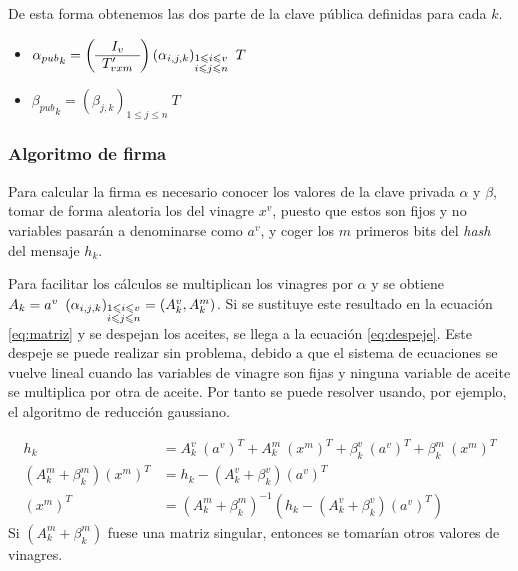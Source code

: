De esta forma obtenemos las dos parte de la clave pública definidas para cada $k$.

\begin{itemize}
	\item ${\alpha_{pub}}_k = \left(
	\begin{array}{c}
	I_v \\
	\hline
	T'_{v x m}
	\end{array}
	\right) \left(\alpha_{i,j,k}\right)_{\begin{subarray}{l}{1 \leqslant i\leqslant v }\\ {i\leqslant j \leqslant n}\end{subarray}} \ T$
	
	\item ${\beta_{pub}}_k = \left(\beta_{j,k}\right)_{1\leqslant j\leqslant n}\ T$
\end{itemize}


\subsubsection{Algoritmo de firma}

Para calcular la firma es necesario conocer los valores de la clave privada $\alpha$ y $\beta$, tomar de forma aleatoria los del vinagre $x^v$, puesto que estos son fijos y no variables pasarán a denominarse como $a^v$, y coger los $m$ primeros bits del \textit{hash} del mensaje $h_k$.

Para facilitar los cálculos se multiplican los vinagres por $\alpha$ y se obtiene \mbox{$A_k = a^v\ \left(\alpha_{i,j,k}\right)_{\begin{subarray}{l}{1 \leqslant i\leqslant v }\\ {i\leqslant j \leqslant n}\end{subarray}} = \left(A^v_k, A^m_k\right)$}. Si se sustituye este resultado en la ecuación \ref{eq:matriz} y se despejan los aceites, se llega a la ecuación \ref{eq:despeje}. Este despeje se puede realizar sin problema, debido a que el sistema de ecuaciones se vuelve lineal cuando las variables de vinagre son fijas y ninguna variable de aceite se multiplica por otra de aceite. Por tanto se puede resolver usando, por ejemplo, el algoritmo de reducción gaussiano.

\begin{align}
h_k &= A_k^v\ (a^v)^{\scriptscriptstyle T} +  A_k^m\ (x^m)^{\scriptscriptstyle T} + \beta_k^v\ (a^v)^{\scriptscriptstyle T} + \beta_k^m\ (x^m)^{\scriptscriptstyle T}\\
\label{eq:ter-coef}
(A_k^m + \beta_k^m) (x^m)^{\scriptscriptstyle T} &= h_k - (A_k^v + \beta_k^v) (a^v)^{\scriptscriptstyle T}\\
\label{eq:despeje}
(x^m)^{\scriptscriptstyle T} &= (A_k^m + \beta_k^m)^{-1} (h_k - (A_k^v + \beta_k^v) (a^v)^{\scriptscriptstyle T})
\end{align}
Si $(A_k^m + \beta_k^m)$ fuese una matriz singular, entonces se tomarían otros valores de vinagres.

